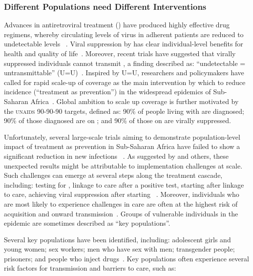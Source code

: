 \subsubsection*{Different Populations need Different \hiv Interventions}
Advances in \hiv antiretroviral treatment (\art)
have produced highly effective drug regimens,
whereby circulating levels of \hiv virus
in adherent patients are reduced to undetectable levels%
~\cite{TBD}.
Viral suppression by \art has clear individual-level benefits
for health and quality of life~\cite{TBD}.
Moreover, recent trials have suggested that
virally suppressed individuals cannot transmit \hiv,
a finding described as:
``undetectable = untransmittable'' (U=U)~\cite{Eisinger2019}.
Inspired by U=U, researchers and policymakers have called for
rapid scale-up of \art coverage
as the main intervention by which to reduce \hiv incidence (``treatment as prevention'')
in the widespread epidemics of Sub-Saharan Africa~\cite{TBD}.
Global ambition to scale up \art coverage is further motivated by
the \textsc{unaids} \mbox{90-90-90} targets, defined as:
90\% of people living with \hiv are diagnosed;
90\% of those diagnosed are on \art; and
90\% of those on \art are virally suppressed.
\par
Unfortunately, several large-scale trials aiming to demonstrate
population-level impact of treatment as prevention in Sub-Saharan Africa
have failed to show a significant reduction in new infections%
~\cite{Iwuji2018,Havlir2018,Hayes2019}.
As suggested by \textcite{Baral2019} and others, these unexpected results
might be attributable to implementation challenges at scale.
Such challenges can emerge at several steps along the treatment cascade, including:
testing for \hiv,
linkage to care after a positive test,
starting \art after linkage to care,
achieving viral suppression after starting \art~\cite{TBD}.
Moreover, individuals who are most likely to experience challenges in \hiv care
are often at the highest risk of \hiv acquisition and onward transmission~\cite{TBD}.
Groups of vulnerable individuals in the epidemic
are sometimes described as ``key populations''.
\par
Several key populations have been identified, including:
adolescent girls and young women;
sex workers;
men who have sex with men;
transgender people;
prisoners;
and people who inject drugs~\cite{WHO2014HIVKP}.
Key populations often experience
several risk factors for \hiv transmission and barriers to care, such as:
